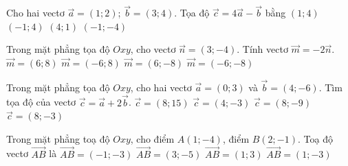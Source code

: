 

\begin{ex}%
	Cho hai vectơ $\overrightarrow{a}=(1;2)$; $\overrightarrow{b}=(3;4)$. Tọa độ $\overrightarrow{c}=4\overrightarrow{a}-\overrightarrow{b}$  bằng
	 \choice
		 {\True $(1;4)$}
		 {$(-1;4)$}
		{$(4;1)$} 
		 {$(-1;-4)$}
\end{ex}

\begin{ex}%
	Trong mặt phẳng tọa  độ $Oxy$, cho vectơ $\overrightarrow{n}=(3;-4)$. Tính vectơ $\overrightarrow{m}=-2\overrightarrow{n}$.
	 \choice
		 {$\overrightarrow{m}=(6;8)$}
		{\True $\overrightarrow{m}=(-6;8)$} 
		{$\overrightarrow{m}=(6;-8)$} 
		 {$\overrightarrow{m}=(-6;-8)$}
\end{ex}

\begin{ex}%
	Trong mặt phẳng tọa độ $Oxy$, cho hai vectơ $\overrightarrow{a}=\left(0;3\right)$ và  $\overrightarrow{b}=\left(4;-6\right)$. Tìm tọa độ của vectơ $\overrightarrow{c}=\overrightarrow{a}+2\overrightarrow{b}$.
	\choice 
		{$\overrightarrow{c}=\left(8;15\right)$} 
		 {$\overrightarrow{c}=\left(4;-3\right)$}
		{\True  $\overrightarrow{c}=\left(8;-9\right)$}
		{$\overrightarrow{c}=\left(8;-3\right)$} 
\end{ex}

\begin{ex}%
	Trong mặt phẳng toạ độ $Oxy$, cho điểm  $A(1;-4)$, điểm $B(2;-1)$. Toạ độ vectơ $\overrightarrow{AB}$ là
	 \choice
		 {$\overrightarrow{AB}=(-1;-3)$}
		 {$\overrightarrow{AB}=(3;-5)$}
		{\True $\overrightarrow{AB}=(1;  3)$}
		{$\overrightarrow{AB}=(1;-3)$} 
\end{ex}


